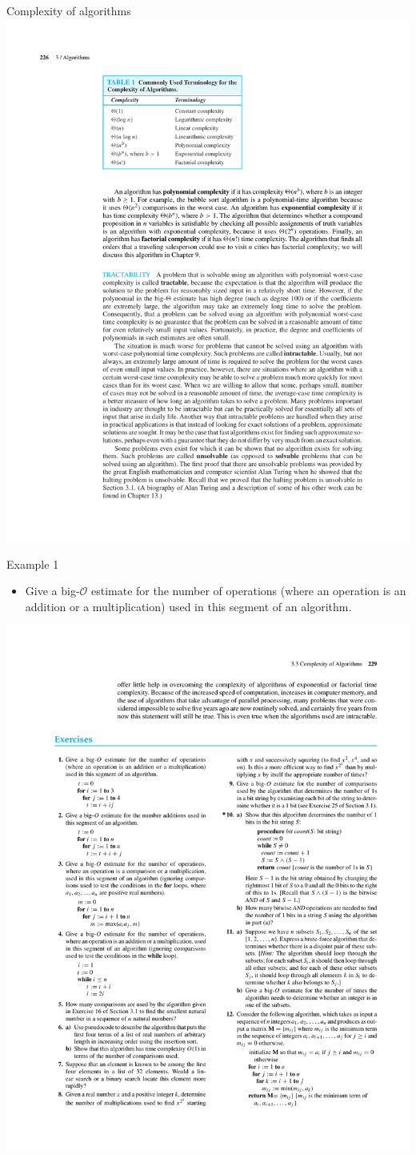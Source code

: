 \documentclass{beamer}
\theoremstyle{definition}
\begin{document}
\begin{frame}{Complexity of algorithms}
    \centering \includegraphics[trim={2cm 19cm 6cm 3cm},clip,width=\linewidth]{p226}
\end{frame}

\begin{frame}{Example 1}
    \begin{itemize}
     \item Give a big-$\mathcal{O}$ estimate for the number of operations (where an operation is an addition or a multiplication) used in this segment of an algorithm.
    \end{itemize}

    \centering \includegraphics[trim={3cm 18cm 15cm 8.2cm},clip,width=0.4\linewidth]{p229}
\end{frame}
\end{document}
